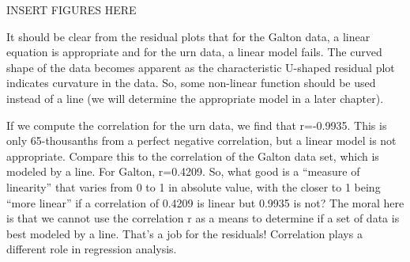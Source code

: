 \documentclass[10pt,]{book}
\theoremstyle{ptxdefinitionnotitle}
\theoremstyle{ptxdefinitiontitle}
\numberwithin{equation}{section}
\begin{document}
\par
\hypertarget{p-113}{}%
INSERT FIGURES HERE%
\par
\hypertarget{p-114}{}%
It should be clear from the residual plots that for the Galton data, a linear equation is appropriate and for the urn data, a linear model fails.  The curved shape of the data becomes apparent as the characteristic U-shaped residual plot indicates curvature in the data.  So, some non-linear function should be used instead of a line (we will determine the appropriate model in a later chapter).%
\par
\hypertarget{p-115}{}%
If we compute the correlation for the urn data, we find that r=-0.9935.  This is only 65-thousanths from a perfect negative correlation, but a linear model is not appropriate.  Compare this to the correlation of the Galton data set, which is modeled by a line.  For Galton, r=0.4209.    So, what good is a “measure of linearity” that varies from 0 to 1 in absolute value, with the closer to 1 being “more linear” if a correlation of 0.4209 is linear but 0.9935 is not?   The moral here is that we cannot use the correlation r as a means to determine if a set of data is best modeled by a line. That’s a job for the residuals!  Correlation plays a different role in regression analysis.%
\typeout{************************************************}
\typeout{************************************************}
\end{document}
